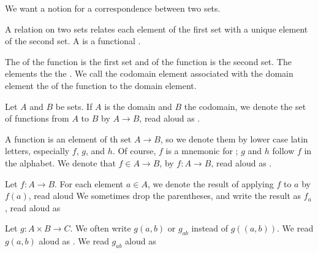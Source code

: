 
\sbasic




\sstart



We want a notion for a correspondence
between two sets.


A  relation
on two sets relates each element of the
first set with a unique element of the
second set.
A  is a
functional .

The  of the function is
the first set and 
of the function is the second set.
The 
 elements
 the
 
the .
We call the codomain element associated
with the domain element the
 of
the function to the domain element.


Let $A$ and $B$ be sets.
If $A$ is the domain and $B$ the codomain,
we denote the set of functions from $A$ to
$B$ by $A \to B$, read aloud as .

A function is an element of th set $A \to B$,
so we denote them by lower case latin letters,
especially $f$, $g$, and $h$.
Of course, $f$ is a mnemonic for
;
$g$ and $h$ follow $f$ in the alphabet.
We denote that $f \in A \to B$, by
$f: A \to B$, read aloud as
.

Let $f: A \to B$.
For each element $a \in A$, we denote the
result of applying
$f$ to $a$ by $f(a)$, read aloud
We sometimes drop the parentheses, and write
the result as $f_a$, read aloud as

Let $g: A \times B \to C$.
We often write $g(a,b)$ or $g_{ab}$
instead of $g((a,b))$.
We read $g(a, b)$ aloud as
.
We read $g_{ab}$ aloud as



